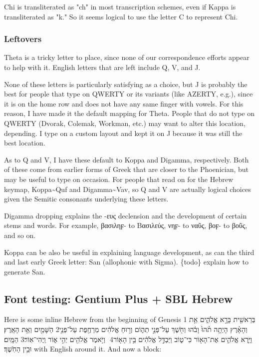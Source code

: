 \documentclass[11pt]{article}
\begin{document}
Chi is transliterated as "ch" in most transcription schemes, even if Kappa is transliterated as "k." So it seems logical to use the letter C to represent Chi.

\subsubsection{Leftovers}
\label{sec:orga3ee0d3}

Theta is a tricky letter to place, since none of our correspondence efforts appear to help with it. English letters that are left include Q, V, and J.

None of these letters is particularly satisfying as a choice, but J is probably the best for people that type on QWERTY or its variants (like AZERTY, e.g.), since it is on the home row and does not have any same finger with vowels. For this reason, I have made it the default mapping for Theta. People that do not type on QWERTY (Dvorak, Colemak, Workman, etc.) may want to alter this location, depending. I type on a custom layout and kept it on J because it was still the best location.

As to Q and V, I have these default to Koppa and Digamma, respectively. Both of these come from earlier forms of Greek that are closer to the Phoenician, but may be useful to type on occasion. For people that read on for the Hebrew keymap, Koppa\textasciitilde{}Quf and Digamma\textasciitilde{}Vav, so Q and V are actually logical choices given the Semitic consonants underlying these letters.

Digamma dropping explains the -ευς declension and the development of certain stems and words. For example, βασιληϝ- to Βασιλεύς, νηϝ- to ναῦς, βοϝ- to βοῦς, and so on.

Koppa can be also be useful in explaining language development, as can the third and last early Greek letter: San (allophonic with Sigma). \{todo\} explain how to generate San.

\subsection{Font testing: Gentium Plus + SBL Hebrew}
\label{sec:orgc1e2147}

Here is some inline Hebrew from the beginning of Genesis 1 \texthebrew{‏בְּרֵאשִׁ֖ית בָּרָ֣א אֱלֹהִ֑ים אֵ֥ת הַשָּׁמַ֖יִם וְאֵ֥ת הָאָֽרֶץ׃ ‎2‏ וְהָאָ֗רֶץ הָיְתָ֥ה תֹ֨הוּ֙ וָבֹ֔הוּ וְחֹ֖שֶׁךְ עַל־פְּנֵ֣י תְה֑וֹם וְר֣וּחַ אֱלֹהִ֔ים מְרַחֶ֖פֶת עַל־פְּנֵ֥י הַמָּֽיִם׃ ‎3‏ וַיֹּ֥אמֶר אֱלֹהִ֖ים יְהִ֣י א֑וֹר וַֽיְהִי־אֽוֹר׃ ‎4‏ וַיַּ֧רְא אֱלֹהִ֛ים אֶת־הָא֖וֹר כִּי־ט֑וֹב וַיַּבְדֵּ֣ל אֱלֹהִ֔ים בֵּ֥ין הָא֖וֹר וּבֵ֥ין הַחֹֽשֶׁךְ׃} with English around it. And now a block:
\end{document}
